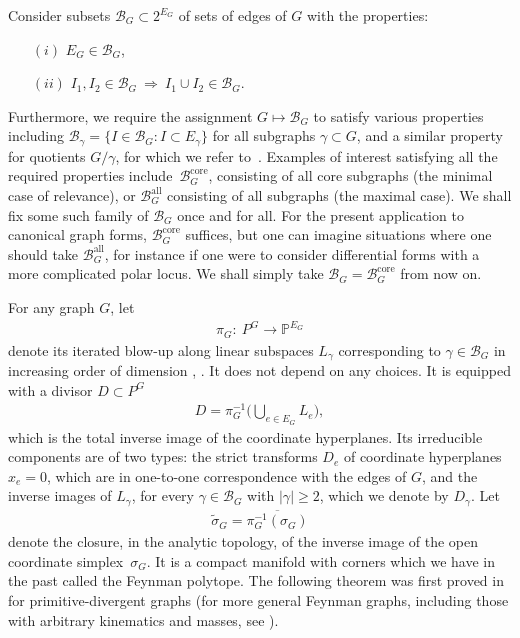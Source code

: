 \documentclass[pdftex]{sigma}%
\numberwithin{equation}{section}
\newcommand{\To}{\longrightarrow}
\newcommand{\Pro}{\mathbb P}
\newcommand{\0}{\color{blue}{\mathsf{0}}}
\begin{document}
Consider subsets $\mathcal{B}_G\subset 2^{E_G}$ of sets of edges of $G$ with the properties:
\begin{enumerate}\itemsep=0pt
\item[$(i)$] $E_G \in \mathcal{B}_G$,

\item[$(ii)$] $I_1, I_2 \in \mathcal{B}_G \ \Longrightarrow \ I_1 \cup I_2 \in \mathcal{B}_G$.
\end{enumerate}
Furthermore, we require the assignment $G\mapsto \mathcal{B}_G$ to satisfy various properties including $\mathcal{B}_{\gamma} = \{I\in \mathcal{B}_{G} \colon I\subset E_\gamma\}$ for all subgraphs $\gamma \subset G$, and a similar property for quotients $G/\gamma$, for which we refer to~\cite[Section~5.1]{Cosmic}.
Examples of interest satisfying all the required properties include~$\mathcal{B}^{\mathrm{core}}_G$, consisting of all core subgraphs (the minimal case of relevance), or $\mathcal{B}^{\mathrm{all}}_G$ consisting of all subgraphs (the maximal case). We shall fix some such family of $\mathcal{B}_{G}$ once and for all. For the present application to canonical graph forms, $\mathcal{B}^{\mathrm{core}}_G$ suffices, but one can imagine situations where one should take $\mathcal{B}^{\mathrm{all}}_G$, for instance if one were to consider differential forms with a more complicated polar locus. We shall simply take $\mathcal{B}_G=\mathcal{B}^{\mathrm{core}}_G$ from now on.

 For any graph $G$, let
\begin{gather} \label{piGdefn}
\pi_G\colon\ P^{G} \To \Pro^{E_G}
\end{gather}
denote its iterated blow-up along linear subspaces $L_{\gamma}$ corresponding to $\gamma \in \mathcal{B}_G$ in increasing order of dimension \cite{BEK}, \cite[Definition 6.3]{Cosmic}. It does not depend on any choices.
 It is equipped with a divisor $D \subset P^{G}$
 \begin{gather*}
 D = \pi_G^{-1}\bigg(\bigcup_{e\in E_G} L_{e}\bigg),
 \end{gather*}
which is the total inverse image of the coordinate hyperplanes. Its irreducible components are of two types: the strict transforms $D_e$ of coordinate hyperplanes $x_e=0$, which are in one-to-one correspondence with the edges of $G$, and the inverse images of $L_{\gamma}$, for every $\gamma \in \mathcal{B}_G$ with $|\gamma| \geq 2$, which we denote by $D_{\gamma}$. Let
 \begin{gather*}
 \widetilde{\sigma}_G = \overline{\pi_G^{-1} ( \sigma_G )}
 \end{gather*}
 denote the closure, in the analytic topology, of the inverse image of the open coordinate simplex~$\sigma_G$. It is a compact manifold with corners which we have in the past called the Feynman polytope. The following theorem was first proved in \cite{BEK} for primitive-divergent graphs (for more general Feynman graphs, including those with arbitrary kinematics and masses, see \cite[Theorem~5.1]{Cosmic}).
\end{document}
